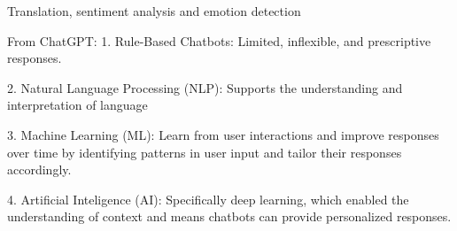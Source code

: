 Translation, sentiment analysis and emotion detection \citep{Hirschberg}



From ChatGPT:
1. Rule-Based Chatbots: Limited, inflexible, and prescriptive responses.

2. Natural Language Processing (NLP): Supports the understanding and interpretation of language

3. Machine Learning (ML): Learn from user interactions and improve responses over time by identifying patterns in user input and tailor their responses accordingly.

4. Artificial Inteligence (AI): Specifically deep learning, which enabled the understanding of context and means chatbots can provide personalized responses.